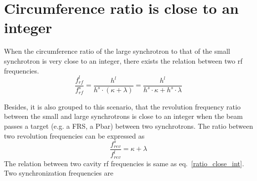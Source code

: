 \section{Circumference ratio is close to an integer}
\label{sec:close_to_int}
When the circumference ratio of the large synchrotron to that of the small synchrotron is very close to an integer, there exists the relation between two rf frequencies. 
\begin{equation} 
\label{ratio_close_int}
\frac{f_{\mathit{rf}}^{l}}{f_{\mathit{rf}}^{s}}=\frac{h^l}{h^s \cdot ( \kappa+ \lambda)}=\frac{h^l}{h^s \cdot  \kappa+ h^s \cdot \lambda}
\end{equation}




Besides, it is also grouped to this scenario, that the revolution frequency ratio between the small and large synchrotrons is close to an integer when the beam passes a target (e.g. a FRS, a Pbar) between two synchrotrons. The ratio between two revolution frequencies can be expressed as
\begin{equation} 
\frac{f_{\mathit{rev}}^{s}}{f_{\mathit{rev}}^{l}}=\kappa+ \lambda\label{close_to_interger1}
\end{equation}
The relation between two cavity rf frequencies is same as eq.~\ref{ratio_close_int}. Two synchronization frequencies are

